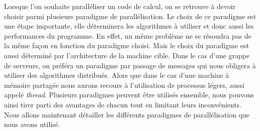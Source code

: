 Lorsque l'on souhaite paralléliser un code de calcul, on se retrouve à devoir choisir parmi plusieurs paradigme de parallélisation.
%
Le choix de ce paradigme est une étape importante, elle déterminera les algorithmes à utiliser et donc aussi les performances du programme.
%
En effet, un même problème ne se résoudra pas de la même façon en fonction du paradigme choisi.
%
Mais le choix du paradigme est aussi déterminé par l'architecture de la machine cible.
%
Dans le cas d'une grappe de serveurs, on préféra un paradigme par passage de messages qui nous obligera à utiliser des algorithmes distribués. %
%
Alors que dans le cas d'une machine à mémoire partagée nous aurons recours à l'utilisation de processus légers, aussi appelé {\em thread}.
%
Plusieurs paradigmes peuvent être utilisés ensemble, nous pouvons ainsi tirer parti des avantages de chacun tout en limitant leurs inconvénients.
%
Nous allons maintenant détailler les différents paradigmes de parallélisation que nous avons utilisé.
